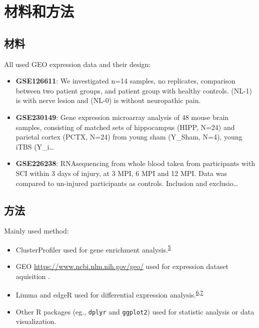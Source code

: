 \documentclass[
]{article}
\providecommand{\tightlist}{%
  \setlength{\itemsep}{0pt}\setlength{\parskip}{0pt}}
\begin{document}
\hypertarget{methods}{%
\section{材料和方法}\label{methods}}

\hypertarget{ux6750ux6599}{%
\subsection{材料}\label{ux6750ux6599}}

All used GEO expression data and their design:

\begin{itemize}
\item
  \textbf{GSE126611}: We investigated n=14 samples, no replicates, comparison between two patient groups, and patient group with healthy controls. (NL-1) is with nerve lesion and (NL-0) is without neuropathic pain.
\item
  \textbf{GSE230149}: Gene expression microarray analysis of 48 mouse brain samples, consisting of matched sets of hippocampus (HIPP, N=24) and parietal cortex (PCTX, N=24) from young sham (Y\_Sham, N=4), young iTBS (Y\_i\ldots{}
\item
  \textbf{GSE226238}: RNAsequencing from whole blood taken from participants with SCI within 3 days of injury, at 3 MPI, 6 MPI and 12 MPI. Data was compared to un-injured participants as controls. Inclusion and exclusio\ldots{}
\end{itemize}

\hypertarget{ux65b9ux6cd5}{%
\subsection{方法}\label{ux65b9ux6cd5}}

Mainly used method:

\begin{itemize}
\tightlist
\item
  ClusterProfiler used for gene enrichment analysis.\textsuperscript{\protect\hyperlink{ref-ClusterprofilerWuTi2021}{5}}
\item
  GEO \url{https://www.ncbi.nlm.nih.gov/geo/} used for expression dataset aquisition .
\item
  Limma and edgeR used for differential expression analysis.\textsuperscript{\protect\hyperlink{ref-LimmaPowersDiRitchi2015}{6},\protect\hyperlink{ref-EdgerDifferenChen}{7}}
\item
  Other R packages (eg., \texttt{dplyr} and \texttt{ggplot2}) used for statistic analysis or data visualization.
\end{itemize}
\end{document}
